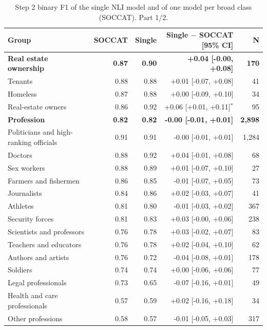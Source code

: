 \begin{table}[htbp]
\centering
\scriptsize
\begin{threeparttable}
\caption{Step 2 binary F1 of the single NLI model and of one model per broad class (SOCCAT). Part 1/2.}
\label{tab:single-nli-part1}
\begin{tabular}{l rr r r}
\toprule
Group & SOCCAT & Single & Single $-$ SOCCAT [95\% CI] & N \\
\midrule
\textbf{Real estate ownership} & \textbf{0.87} & \textbf{0.90} & \textbf{+0.04 [-0.00, +0.08]} & \textbf{170} \\
\quad Tenants & 0.88 & 0.88 & +0.01 [-0.07, +0.08] & 41 \\
\quad Homeless & 0.87 & 0.88 & +0.00 [-0.09, +0.10] & 34 \\
\quad Real-estate owners & 0.86 & 0.92 & +0.06 [+0.01, +0.11]$^{*}$ & 95 \\
\addlinespace
\textbf{Profession} & \textbf{0.82} & \textbf{0.82} & \textbf{-0.00 [-0.01, +0.01]} & \textbf{2,898} \\
\quad Politicians and high-ranking officials & 0.91 & 0.91 & -0.00 [-0.01, +0.01] & 1,284 \\
\quad Doctors & 0.88 & 0.92 & +0.04 [-0.01, +0.08] & 68 \\
\quad Sex workers & 0.88 & 0.89 & +0.01 [-0.07, +0.10] & 27 \\
\quad Farmers and fishermen & 0.86 & 0.85 & -0.01 [-0.07, +0.05] & 73 \\
\quad Journalists & 0.84 & 0.86 & +0.02 [-0.03, +0.07] & 41 \\
\quad Athletes & 0.81 & 0.80 & -0.01 [-0.03, +0.02] & 367 \\
\quad Security forces & 0.81 & 0.83 & +0.03 [-0.00, +0.06] & 238 \\
\quad Scientists and professors & 0.76 & 0.78 & +0.03 [-0.02, +0.07] & 83 \\
\quad Teachers and educators & 0.76 & 0.78 & +0.02 [-0.04, +0.10] & 62 \\
\quad Authors and artists & 0.76 & 0.72 & -0.04 [-0.08, +0.01] & 178 \\
\quad Soldiers & 0.74 & 0.74 & +0.00 [-0.06, +0.06] & 77 \\
\quad Legal professionals & 0.73 & 0.65 & -0.07 [-0.16, +0.01] & 49 \\
\quad Health and care professionals & 0.57 & 0.59 & +0.02 [-0.16, +0.18] & 34 \\
\quad Other professions & 0.58 & 0.57 & -0.01 [-0.05, +0.03] & 317 \\

\end{tabular}
\end{threeparttable}
\end{table}
